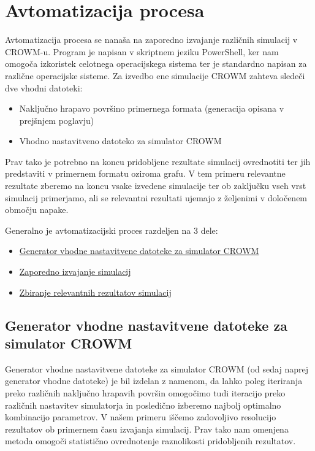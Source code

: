 \documentclass[a4paper,twoside,openright,12pt,slovene]{book}
\begin{document}
\chapter{Avtomatizacija procesa}

Avtomatizacija procesa se nanaša na zaporedno izvajanje različnih simulacij v CROWM-u. Program je napisan v skriptnem jeziku PowerShell, ker nam omogoča izkoristek celotnega operacijskega sistema ter je standardno napisan za različne operacijske sisteme. Za izvedbo ene simulacije CROWM zahteva sledeči dve vhodni datoteki:

\begin{itemize}
    \setlength\itemsep{0.1em}
    \item Naključno hrapavo površino primernega formata (generacija opisana v prejšnjem poglavju)
    \item Vhodno nastavitveno datoteko za simulator CROWM
\end{itemize}

Prav tako je potrebno na koncu pridobljene rezultate simulacij ovrednotiti ter jih predstaviti v primernem formatu oziroma grafu. V tem primeru relevantne rezultate zberemo na koncu vsake izvedene simulacije ter ob zaključku vseh vrst simulacij primerjamo, ali se relevantni rezultati ujemajo z željenimi v določenem območju napake. 

\noindent Generalno je avtomatizacijski proces razdeljen na 3 dele:

\begin{itemize}
    \setlength\itemsep{0.1em}
    \item \hyperref[generatorVhodneDatoteke]{Generator vhodne nastavitvene datoteke za simulator CROWM}
    \item \hyperref[zaporednoIzvajanje]{Zaporedno izvajanje simulacij}
    \item \hyperref[zbiranjeRezultatov]{Zbiranje relevantnih rezultatov simulacij}
\end{itemize}


\section{Generator vhodne nastavitvene datoteke za simulator CROWM}
\label{generatorVhodneDatoteke}

Generator vhodne nastavitvene datoteke za simulator CROWM (od sedaj naprej generator vhodne datoteke) je bil izdelan z namenom, da lahko poleg iteriranja preko različnih naključno hrapavih površin omogočimo tudi iteracijo preko različnih nastavitev simulatorja in posledično izberemo najbolj optimalno kombinacijo parametrov. V našem primeru iščemo zadovoljivo resolucijo rezultatov ob primernem času izvajanja simulacij. Prav tako nam omenjena metoda omogoči statistično ovrednotenje raznolikosti pridobljenih rezultatov. 
\end{document}
